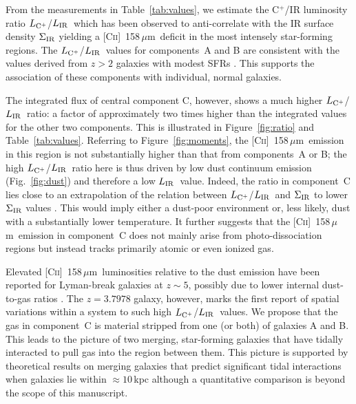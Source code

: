 \documentclass[twocolumn]{aastex62}
\newcommand{\cplus}{[\ctwo]~158\,$\mu$m}
\newcommand{\mldust}{L_{\rm IR}}  %
\newcommand{\ldust}{$\mldust$}
\newcommand{\mlcplus}{L_{\rm C^+}}   %
\newcommand{\lcplus}{$\mlcplus$}
\newcommand{\ctwo}{C\textsc{ii}}
\begin{document}

%


%
From the measurements in Table~\ref{tab:values}, we estimate the C$^+$/IR luminosity ratio 
\lcplus/\ldust\ which has been observed to anti-correlate with the IR surface
density $\Sigma_{\rm IR}$ \citep[e.g.][]{smith+17,litke+19} yielding a \cplus\ 
deficit in the most intensely star-forming regions. The \lcplus/\ldust\ values for 
components~A and B are consistent with the values derived from $z>2$ galaxies with 
modest SFRs \citep[e.g.,][]{capak+15}.
This supports the association of these components with individual, normal galaxies.

The integrated flux of central component C, however, shows a much higher \lcplus/\ldust\ ratio: 
a factor of approximately two times higher than the integrated values for the other two 
components. This is illustrated in Figure~\ref{fig:ratio} and Table~\ref{tab:values}. 
Referring to Figure~\ref{fig:moments}, 
the \cplus\ emission in this region is not substantially higher than that from components~A or 
B; the high \lcplus/\ldust\ ratio here is thus driven by low dust continuum emission (Fig.~\ref{fig:dust}) and therefore a low \ldust\ value.  Indeed, the 
ratio in component~C lies close to an extrapolation of the relation between \lcplus/\ldust\ 
and  $\Sigma_{\rm IR}$ to lower $\Sigma_{\rm IR}$ values \citep[see also][]{smith+17}. 
This would imply either a dust-poor environment or, less likely, dust with a 
substantially lower temperature. It further suggests that the \cplus\ emission in 
component~C does not mainly arise from photo-dissociation regions but instead tracks 
primarily atomic or even ionized gas.  


Elevated \cplus\ luminosities relative to the dust emission have been reported for Lyman-break
galaxies at $z \sim 5$, possibly due to lower internal dust-to-gas ratios \citep[e.g.][]{capak+15}.
The $z = 3.7978$ galaxy, however, marks the first report of spatial variations within 
a system to such high \lcplus/\ldust\ values. We propose that the gas in component~C is 
material stripped from one (or both) of galaxies A and B. This leads to the picture of 
two merging, star-forming galaxies that have tidally interacted to  pull gas into the region 
between them. This picture is supported by theoretical results on merging galaxies that 
predict significant tidal interactions when galaxies lie within $\approx 10$\,kpc 
\citep{chill+10} %
although a quantitative comparison is beyond the scope of this manuscript.
\end{document}
